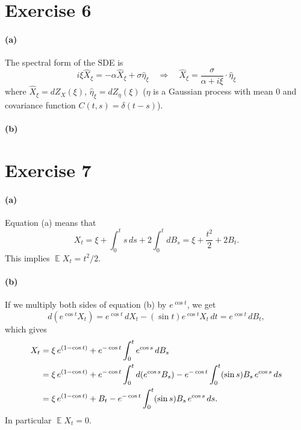 \documentclass[a4paper,11pt]{article}
\theoremstyle{definition}
\theoremstyle{plain}
\theoremstyle{remark}
\DeclarePairedDelimiter{\parr}{(}{)}
\DeclareMathOperator*{\expval}{\mathbb{E}}
\begin{document}
\section*{Exercise 6}

\paragraph*{(a)}

The spectral form of the SDE is
$$
i\xi \hat{X}_\xi = -\alpha\hat{X}_\xi + \sigma\hat{\eta}_\xi \quad\Longrightarrow\quad \hat{X}_\xi = \frac{\sigma}{\alpha+i\xi}\cdot\hat{\eta}_\xi
$$
where $\hat{X}_\xi = dZ_X(\xi)$, $\hat{\eta}_\xi = dZ_\eta(\xi)$ ($\eta$ is a Gaussian process with mean $0$ and covariance function $C(t,s)=\delta(t-s)$).

\paragraph*{(b)}



\section*{Exercise 7}

\paragraph*{(a)}

Equation (a) means that
$$
X_t = \xi + \int_0^ts\,ds + 2\int_0^tdB_s = \xi + \frac{t^2}{2} + 2B_t.
$$
This implies $\expval X_t = t^2/2$.

\paragraph*{(b)}

If we multiply both sides of equation (b) by $e^{\cos t}$, we get
$$
d(e^{\cos t}X_t) = e^{\cos t}\,dX_t - (\sin t)e^{\cos t}X_t\,dt = e^{\cos t}\,dB_t,
$$
which gives
\begin{align*}
X_t & = \xi\,e^{(1-\cos t)} + e^{-\cos t}\int_0^te^{\cos s}\,dB_s  \\ & = \xi\,e^{(1-\cos t)} + e^{-\cos t}\int_0^td\parr*{e^{\cos s}B_s} -e^{-\cos t}\int_0^t(\sin s)B_s\,e^{\cos s}\,ds \\ & = \xi\,e^{(1-\cos t)} + B_t -e^{-\cos t}\int_0^t(\sin s)B_s\,e^{\cos s}\,ds.
\end{align*}
In particular $\expval X_t = 0$.
\end{document}
